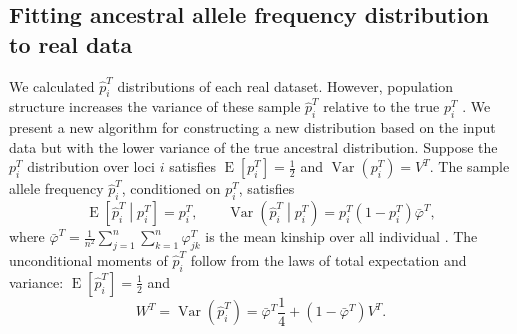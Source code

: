 \documentclass[9pt,lineno]{elife}
\DeclareMathOperator{\E}{E}
\DeclareMathOperator{\Var}{Var}
\newcommand{\kt}[1][k]{\varphi_{j#1}^T}
\newcommand{\pit}{p_i^T}
\newcommand{\pith}{\hat{p}_i^T}
\begin{document}
\appendix
\begin{appendixbox}

  \label{sec:app-af-real-fit}
  
  \subsection{Fitting ancestral allele frequency distribution to real data}

  We calculated $\pith$ distributions of each real dataset.
  However, population structure increases the variance of these sample $\pith$ relative to the true $\pit$ \citep{ochoa_estimating_2021}.
  We present a new algorithm for constructing a new distribution based on the input data but with the lower variance of the true ancestral distribution.
  Suppose the $\pit$ distribution over loci $i$ satisfies $\E \left[ \pit \right] = \frac{1}{2}$ and $\Var \left( \pit \right) = V^T$.
  The sample allele frequency $\pith$, conditioned on $\pit$, satisfies
    $$
    \E \left[ \pith \middle| \pit \right]
    =
    \pit
    , \quad\quad
    \Var \left( \pith \middle| \pit \right)
    =
    \pit \left( 1 - \pit \right) \bar{\varphi}^T
    ,
    $$
  where $\bar{\varphi}^T = \frac{1}{n^2} \sum_{j=1}^n \sum_{k=1}^n \kt$ is the mean kinship over all individual \citep{ochoa_estimating_2021}.
  The unconditional moments of $\pith$ follow from the laws of total expectation and variance: 
  $
  \E \left[ \pith \right]
  =
  \frac{1}{2}
  $
  and
    \begin{equation*}
      W^T
      =
      \Var \left( \pith \right)
      =
      \bar{\varphi}^T \frac{1}{4}
      + \left( 1 - \bar{\varphi}^T \right) V^T
      .
    \end{equation*}

\end{appendixbox}
\end{document}
